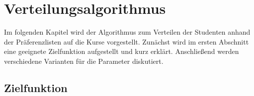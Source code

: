 \chapter{Verteilungsalgorithmus}
\label{chapter:algorithm}
    Im folgenden Kapitel wird der Algorithmus zum Verteilen der Studenten anhand der Präferenzlisten auf die Kurse vorgestellt.
    Zunächst wird im ersten Abschnitt eine geeignete Zielfunktion aufgestellt und kurz erklärt.
    Anschließend werden verschiedene Varianten für die Parameter diskutiert.
    \section{Zielfunktion}
%            

